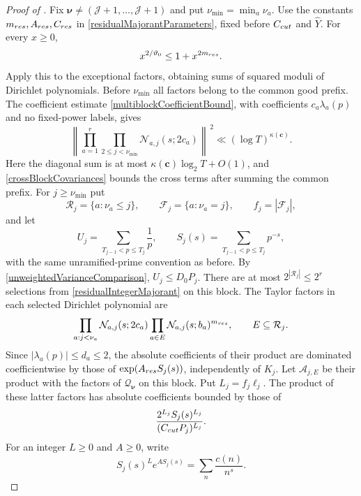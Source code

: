 \documentclass[10pt,a4paper]{amsart}
\begin{document}
		\begin{proof}[Proof of ]
			Fix $\boldsymbol\nu\neq
			(\mathscr J+1,\ldots,\mathscr J+1)$ and put
			$\nu_{\min}=\min_a\nu_a$.  Use the constants
			$m_{\rm res},A_{\rm res},C_{\rm res}$ in
			\eqref{residualMajorantParameters}, fixed before $C_{\rm cut}$ and
			$\widehat Y$.  For every $x\geq0$,
			\begin{equation}\label{residualIntegerMajorant}
				x^{2/\vartheta_0}\leq1+x^{2m_{\rm res}}.
			\end{equation}
			Apply this to the exceptional factors, obtaining sums of squared moduli
			of Dirichlet polynomials.
			Before $\nu_{\min}$ all factors belong to the common good prefix.
			The coefficient estimate \eqref{multiblockCoefficientBound}, with
			coefficients $c_a\lambda_a(p)$ and no fixed-power labels, gives
			\begin{equation}\label{residualCommonPrefixNorm}
				\left\|
				\prod_{a=1}^r\prod_{2\leq j<\nu_{\min}}
				\mathcal N_{a,j}(s;2c_a)
				\right\|^{\,2}
				\ll(\log T)^{\kappa(\boldsymbol c)}.
			\end{equation}
			Here the diagonal sum is at most $\kappa(\boldsymbol c)\log_2T+O(1)$,
			and \eqref{crossBlockCovariances} bounds the cross terms after summing
			the common prefix.
			For $j\geq\nu_{\min}$ put
			\[
			\mathcal R_j=\{a:\nu_a\leq j\},\qquad
			\mathcal F_j=\{a:\nu_a=j\},\qquad f_j=|\mathcal F_j|,
			\]
			and let
			\[
			U_j=\sum_{T_{j-1}<p\leq T_j}\frac1p,\qquad
			S_j(s)=\sum_{T_{j-1}<p\leq T_j}p^{-s},
			\]
			with the same unramified-prime convention as before.  By
			\eqref{unweightedVarianceComparison}, $U_j\leq D_0P_j$.
			There are at most $2^{|\mathcal R_j|}\leq2^r$ selections from
			\eqref{residualIntegerMajorant} on this block. The Taylor factors in
			each selected Dirichlet polynomial are
			\[
			\prod_{a:j<\nu_a}\mathcal N_{a,j}(s;2c_a)
			\prod_{a\in E}\mathcal N_{a,j}(s;b_a)^{m_{\rm res}},
			\qquad E\subseteq\mathcal R_j.
			\]
			Since $|\lambda_a(p)|\leq d_a\leq2$, the absolute coefficients of their product
			are dominated coefficientwise by those of
			$\exp(A_{\rm res}S_j(s))$, independently of $K_j$.
			Let $\mathcal A_{j,E}$ be their product with the factors of
			$\mathcal Q_{\boldsymbol\nu}$ on this block. Put $L_j=f_j\ell_j$.
			The product of these latter factors has absolute coefficients bounded by those of
			\[
			\frac{2^{L_j}S_j(s)^{L_j}}
			{(C_{\rm cut}P_j)^{L_j}}.
			\]
			For an integer $L\geq0$ and $A\geq0$, write
			\[
			S_j(s)^L e^{AS_j(s)}=\sum_n\frac{c(n)}{n^s}.
\]
\end{proof}
\end{document}
